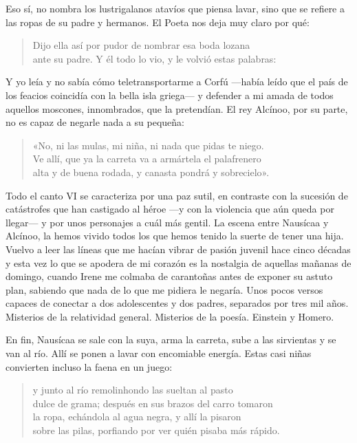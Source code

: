 \documentclass[11pt,a4paper]{article}
\begin{document}
Eso sí, no nombra los lustrigalanos atavíos que piensa lavar, sino que se refiere a las ropas de su padre y hermanos. El Poeta nos deja muy claro por qué:

\begin{verse}
Dijo ella así por pudor de nombrar esa boda lozana\\
ante su padre. Y él todo lo vio, y le volvió estas palabras:
\end{verse}

Y yo leía y no sabía cómo teletransportarme a Corfú ---había leído que el país de los feacios coincidía con la bella isla griega--- y defender a mi amada de todos aquellos moscones, innombrados, que la pretendían. El rey Alcínoo, por su parte, no es capaz de negarle nada a su pequeña:

\begin{verse}
«No, ni las mulas, mi niña, ni nada que pidas te niego.\\
Ve allí, que ya la carreta va a armártela el palafrenero\\
alta y de buena rodada, y canasta pondrá y sobrecielo».
\end{verse}

Todo el canto VI se caracteriza por una paz sutil, en contraste con la sucesión de catástrofes que han castigado al héroe ---y con la violencia que aún queda por llegar--- y por unos personajes a cuál más gentil. La escena entre Nausícaa y Alcínoo, la hemos vivido todos los que hemos tenido la suerte de tener una hija. Vuelvo a leer las líneas que me hacían vibrar de pasión juvenil hace cinco décadas y esta vez lo que se apodera de mi corazón es la nostalgia de aquellas mañanas de domingo, cuando Irene me colmaba de carantoñas antes de exponer su astuto plan, sabiendo que nada de lo que me pidiera le negaría. Unos pocos versos capaces de conectar a dos adolescentes y dos padres, separados por tres mil años. Misterios de la relatividad general. Misterios de la poesía. Einstein y Homero.

En fin, Nausícaa se sale con la suya, arma la carreta, sube a las sirvientas y se van al río. Allí se ponen a lavar con encomiable energía. Estas casi niñas convierten incluso la faena en un juego:

\begin{verse}
y junto al río remolinhondo las sueltan al pasto\\
dulce de grama; después en sus brazos del carro tomaron\\
la ropa, echándola al agua negra, y allí la pisaron\\
sobre las pilas, porfiando por ver quién pisaba más rápido.
\end{verse}
\end{document}
